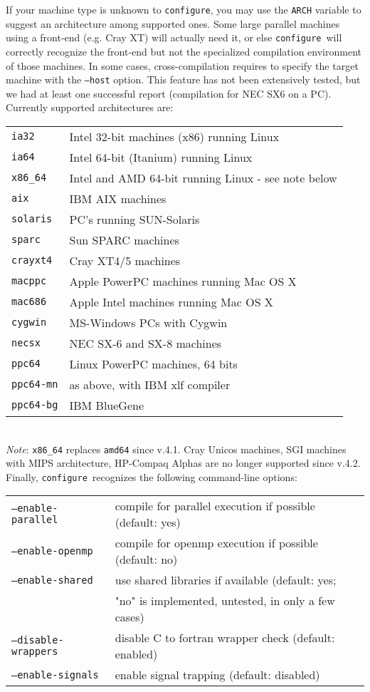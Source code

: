 \documentclass[12pt,a4paper]{article}
\def\configure{\texttt{configure}}
\begin{document}
If your machine type is unknown to \configure, you may use the 
\texttt{ARCH}
variable to suggest an architecture among supported ones. Some large
parallel machines using a front-end (e.g. Cray XT) will actually
need it, or else \configure\ will correctly recognize the front-end
but not the specialized compilation environment of those
machines. In some cases, cross-compilation requires to specify the target machine with the
\texttt{--host} option. This feature has not been extensively
tested, but we had at least one successful report (compilation 
for NEC SX6 on a PC). Currently supported architectures are:\\
\begin{tabular}{ll}
\texttt{ia32}&    Intel 32-bit machines (x86) running Linux\\
\texttt{ia64}&    Intel 64-bit (Itanium) running Linux\\
\texttt{x86\_64}&  Intel and AMD 64-bit running Linux - see note below\\
\texttt{aix}&     IBM AIX machines\\
\texttt{solaris}& PC's running SUN-Solaris\\
\texttt{sparc}&   Sun SPARC machines\\
\texttt{crayxt4}& Cray XT4/5 machines\\
\texttt{macppc}&  Apple PowerPC machines running Mac OS X\\
\texttt{mac686}&  Apple Intel machines running Mac OS X\\
\texttt{cygwin}&  MS-Windows PCs with Cygwin\\
\texttt{necsx}&   NEC SX-6 and SX-8 machines\\
\texttt{ppc64}&   Linux PowerPC machines, 64 bits\\
\texttt{ppc64-mn}&as above, with IBM xlf compiler\\
\texttt{ppc64-bg}&IBM BlueGene
\end{tabular}\\
{\em Note}: \texttt{x86\_64} replaces \texttt{amd64} since v.4.1. 
Cray Unicos machines, SGI 
machines with MIPS architecture, HP-Compaq Alphas are no longer supported
since v.4.2.
Finally, \configure\ recognizes the following command-line options:\\
\begin{tabular}{ll}
\texttt{--enable-parallel}&     compile for parallel execution if possible (default: yes)\\
\texttt{--enable-openmp}&       compile for openmp execution if possible (default: no)\\
\texttt{--enable-shared}&       use shared libraries if available (default: yes;\\
                        &       "no" is implemented, untested, in only a few cases)\\
\texttt{--disable-wrappers}&    disable C to fortran wrapper check (default: enabled)\\
\texttt{--enable-signals}&      enable signal trapping (default: disabled)\\
\end{tabular}\\
\end{document}
